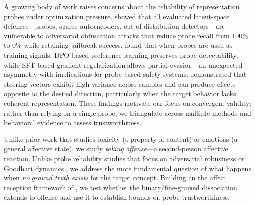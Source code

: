 A growing body of work raises concerns about the reliability of representation probes under optimization pressure.
\citet{bailey2025obfuscated} showed that all evaluated latent-space defenses---probes, sparse autoencoders, out-of-distribution detectors---are vulnerable to adversarial obfuscation attacks that reduce probe recall from 100\% to 0\% while retaining jailbreak success.
\citet{wehner2025probe} found that when probes are used as training signals, DPO-based preference learning preserves probe detectability, while SFT-based gradient regularization allows partial evasion---an unexpected asymmetry with implications for probe-based safety systems.
\citet{braun2025understanding} demonstrated that steering vectors exhibit high variance across samples and can produce effects opposite to the desired direction, particularly when the target behavior lacks coherent representation.
These findings motivate our focus on convergent validity: rather than relying on a single probe, we triangulate across multiple methods and behavioral evidence to assess trustworthiness.

Unlike prior work that studies toxicity (a property of content) or emotions (a general affective state), we study \emph{taking offense}---a second-person affective reaction.
Unlike probe reliability studies that focus on adversarial robustness \citep{bailey2025obfuscated} or Goodhart dynamics \citep{wehner2025probe}, we address the more fundamental question of what happens when \emph{no ground truth exists} for the target concept.
Building on the affect reception framework of \citet{keeman2026whether}, we test whether the binary/fine-grained dissociation extends to offense and use it to establish bounds on probe trustworthiness.